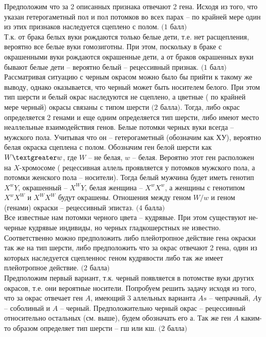 \solutionSection Предположим что за 2 описанных признака отвечают 2 гена. Исходя из того, что указан гетерогаметный пол и пол потомков во всех парах – по крайней мере один из этих признаков наследуется сцеплено с полом. $\textit{(1 балл)}$\\
Т.к. от брака белых вуки рождаются только белые дети, т.е. нет расщепления, вероятно все белые вуки гомозиготны. При этом, поскольку в браке с окрашенными вуки рождаются окрашенные дети, а от браков окрашенных вуки бывают белые дети – вероятно белый – рецессивный признак. $\textit{(1 балл)}$\\
Рассматривая ситуацию с черным окрасом можно было бы прийти к такому же выводу, однако оказывается, что черный может быть носителем белого. При этом тип шерсти и белый окрас наследуются не сцеплено, а цветные ( по крайней мере черный) окрасы связаны с типом шерсти $\textit{(2 балла)}$. Тогда, либо окрас определяется 2 генами и еще одним определяется тип шерсти, либо имеют место неаллельные взаимодействия генов. Белые потомки черных вуки всегда – мужского пола. Учитывая что он – гетерогаметный (обозначим как $ХУ$), вероятно белая окраска сцеплена с полом. Обозначим ген белой шерсти как $W\textgreater w$, где $W$ – не белая, $w$ – белая. Вероятно этот ген расположен на $X$-хромосоме ( рецессивная аллель проявляется у потомков мужского пола, а потомки женского пола – носители). Тогда белый мужчина будет иметь генотип $X^wY$, окрашенный – $X^WY$, белая женщина –  $X^wX^w$, а женщины с генотипом $X^wX^W$ и $X^WX^W$ будут окрашены. Отношения между геном $W/w$ и геном (генами) окраски – рецессивный эпистаз. $\textit{(4 балла)}$\\
Все известные нам потомки черного цвета – кудрявые. При этом существуют не-черные кудрявые индивиды, но черных гладкошерстных не известно. Соответственно можно предположить либо плейотропное действие гена окраски так же на тип шерсти, либо предположить что за окрас отвечают 2 гена, один из которых наследуется сцепленнос геном кудрявости либо так же имеет плейотропное действие. $\textit{(2 балла)}$\\
Предположим первый вариант, т.к. черный появляется в потомстве вуки других окрасов, т.е. они вероятные носители. Попробуем решить задачу исходя из того, что за окрас отвечает ген $A$, имеющий 3 аллельных варианта $As$ – чепрачный, $Aу$ – соболиный и $A$ – черный. Предположительно черный окрас – рецессивный относительно остальных (см. выше), будем обозначать его а. Так же ген $A$ каким-то образом определяет тип шерсти – гш или кш. $\textit{(2 балла)}$\\\\
